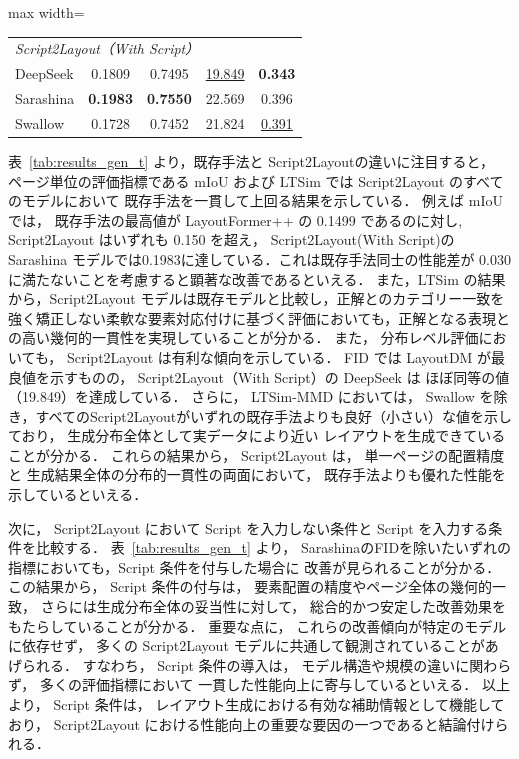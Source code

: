\documentclass[a4j,12pt,dvipdfmx]{jsreport}
\begin{document}
\begin{table}[h]
\begin{adjustbox}{max width=\textwidth}
\begin{tabular}{l c c c c}
      \multicolumn{5}{l}{\itshape Script2Layout（With Script）}                                                                                                             \\
      DeepSeek
                                                      & 0.1809                                              & 0.7495             & \underline{19.849} & \textbf{0.343}    \\
      Sarashina
                                                      & \textbf{0.1983}                                     & \textbf{0.7550}    & 22.569             & 0.396             \\
      Swallow
                                                      & 0.1728                                              & 0.7452             & 21.824             & \underline{0.391} \\
      \bottomrule
    \end{tabular}
  \end{adjustbox}
\end{table}


表~\ref{tab:results_gen_t} より，既存手法と Script2Layoutの違いに注目すると，
ページ単位の評価指標である mIoU および LTSim では
Script2Layout のすべてのモデルにおいて
既存手法を一貫して上回る結果を示している．
例えば mIoU では，
既存手法の最高値が LayoutFormer++ の 0.1499 であるのに対し,
Script2Layout はいずれも 0.150 を超え，
Script2Layout(With Script)の Sarashina モデルでは0.1983に達している．これは既存手法同士の性能差が 0.030 に満たないことを考慮すると顕著な改善であるといえる．
また，LTSim の結果から，Script2Layout モデルは既存モデルと比較し，正解とのカテゴリー一致を強く矯正しない柔軟な要素対応付けに基づく評価においても，正解となる表現との高い幾何的一貫性を実現していることが分かる．
また，
分布レベル評価においても，
Script2Layout は有利な傾向を示している．
FID では LayoutDM が最良値を示すものの，
Script2Layout（With Script）の DeepSeek は
ほぼ同等の値（19.849）を達成している．
さらに，
LTSim-MMD においては，
Swallow を除き，すべてのScript2Layoutがいずれの既存手法よりも良好（小さい）な値を示しており，
生成分布全体として実データにより近い
レイアウトを生成できていることが分かる．
これらの結果から，
Script2Layout は，
単一ページの配置精度と
生成結果全体の分布的一貫性の両面において，
既存手法よりも優れた性能を示しているといえる．

次に，
Script2Layout において
Script を入力しない条件と
Script を入力する条件を比較する．
表~\ref{tab:results_gen_t} より，
SarashinaのFIDを除いたいずれの指標においても，Script 条件を付与した場合に
改善が見られることが分かる．
この結果から，
Script 条件の付与は，
要素配置の精度やページ全体の幾何的一致，
さらには生成分布全体の妥当性に対して，
総合的かつ安定した改善効果をもたらしていることが分かる．
重要な点に，
これらの改善傾向が特定のモデルに依存せず，
多くの Script2Layout モデルに共通して観測されていることがあげられる．
すなわち，
Script 条件の導入は，
モデル構造や規模の違いに関わらず，
多くの評価指標において
一貫した性能向上に寄与しているといえる．
以上より，
Script 条件は，
レイアウト生成における有効な補助情報として機能しており，
Script2Layout における性能向上の重要な要因の一つであると結論付けられる．
\end{document}
